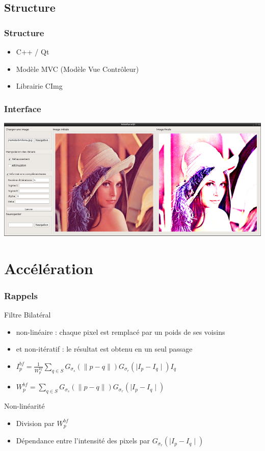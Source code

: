 \documentclass[compress]{beamer}
\begin{document}
\subsection{Structure}
\begin{frame}\frametitle{Structure}
	\begin{block}{}
		\begin{itemize}
			\item C++ / Qt
			\item Modèle MVC (Modèle Vue Contrôleur)
			\item Librairie CImg
		\end{itemize}
	\end{block}
\end{frame}

\begin{frame}\frametitle{Interface}
	\center
	\includegraphics[scale=0.4]{images/screenIHMLaunch.png}
\end{frame}

\section{Accélération}
\begin{frame}\frametitle{Rappels}
	\begin{block}{Filtre Bilatéral}
		\begin{itemize}
			\item non-linéaire : chaque pixel est remplacé par un poids de ses voisins
			\item et non-itératif : le résultat est obtenu en un seul passage
			\item $I_p^{bf} = \frac{1}{W_p^{bf}}\sum_{q\in S} G_{\sigma_s}(\parallel p- q \parallel)G_{\sigma_r}(\mid I_p - I_q \mid) I_q$
			\item $W_p^{bf} = \sum_{q\in S} G_{\sigma_s}(\parallel p- q \parallel)G_{\sigma_r}(\mid I_p - I_q \mid)$
		\end{itemize}
	\end{block}
\pause
	\begin{block}{Non-linéarité}
		\begin{itemize}
			\item Division par $W_p^{bf}$
			\item Dépendance entre l'intensité des pixels par $G_{\sigma_r}(\mid I_p -I_q\mid)$
		\end{itemize}
	\end{block}
\end{frame}
\end{document}
